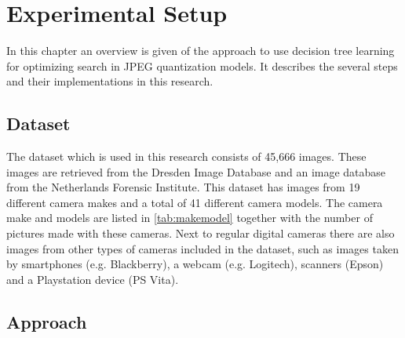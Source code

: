\chapter{Experimental Setup} %
\label{ch:impl} %
In this chapter an overview is given of the approach to use decision tree learning for optimizing search in JPEG quantization models. It describes the several steps and their implementations in this research. 

\section{Dataset}
The dataset which is used in this research consists of 45,666 images. These images are retrieved from the Dresden Image Database \cite{Gloe:2010aa} and an image database from the Netherlands Forensic Institute. This dataset has images from 19 different camera makes and a total of 41 different camera models. The camera make and models are listed in \autoref{tab:makemodel} together with the number of pictures made with these cameras. Next to regular digital cameras there are also images from other types of cameras included in the dataset, such as images taken by smartphones (e.g. Blackberry), a webcam (e.g. Logitech), scanners (Epson) and a Playstation device (PS Vita). 

\section{Approach}

